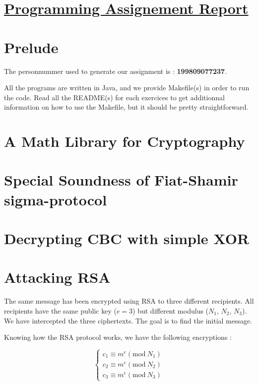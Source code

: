 \documentclass[12pt]{article}
\begin{document}
\section* {\underline{Programming Assignement Report}}

\section*{Prelude}

The personnummer used to generate our assignment is : \textbf{{\large 199809077237}}.

All the programs are written in Java, and we provide Makefile(s) in order to run the code. Read all the README(s) for each exercices to get additionnal information on how to use the Makefile, but it should be pretty straightforward.

\section{A Math Library for Cryptography}

\newpage
\section{Special Soundness of Fiat-Shamir sigma-protocol}

\newpage
\section{Decrypting CBC with simple XOR}

\newpage
\section{Attacking RSA}

The same message has been encrypted using RSA to three different recipients. All recipients have the same public key ($e=3$) but different modulus ($N_1$, $N_2$, $N_3$). We have intercepted the three ciphertexts. The goal is to find the initial message.

Knowing how the RSA protocol works, we have the following encryptions :

$$
\left\{
    \begin{array}{lll}
        c_1 \equiv m^{e} (\textrm{mod}\ N_1)\\
        c_2 \equiv m^{e} (\textrm{mod}\ N_2)\\
        c_3 \equiv m^{e} (\textrm{mod}\ N_3)
    \end{array}
\right.
$$
\end{document}
